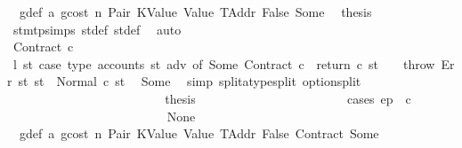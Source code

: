 \begin{isabellebody}
\ {}{\isacharparenleft}{\kern0pt}{}{\isacharparenright}{\kern0pt}\ g{\isacharunderscore}{\kern0pt}def\ a{}\ gcost\ n\ Pair\ KValue\ Value\ TAddr\ False\ Some\ \isamarkupfalse%
\ {\isacharquery}{\kern0pt}thesis\ \isamarkupfalse%
\ stmt{\isachardot}{\kern0pt}psimps{\isacharparenleft}{\kern0pt}{}{\isacharparenright}{\kern0pt}\ st{\isacharprime}{\kern0pt}{\isacharunderscore}{\kern0pt}def\ st{\isacharprime}{\kern0pt}{\isacharprime}{\kern0pt}{\isacharunderscore}{\kern0pt}def\ \isamarkupfalse%
\ auto\isanewline
\ \ \ \ \ \ \ \ \ \ \ \ \ \ \ \ \ \ \ \ \isamarkupfalse%
\isanewline
\ \ \ \ \ \ \ \ \ \ \ \ \ \ \ \ \ \ \ \ \ \ \isamarkupfalse%
\ {\isacharparenleft}{\kern0pt}Contract\ c{\isacharparenright}{\kern0pt}\isanewline
\ \ \ \ \ \ \ \ \ \ \ \ \ \ \ \ \ \ \ \ \ \ \isamarkupfalse%
\ \isamarkupfalse%
\ l{}{\isacharcolon}{\kern0pt}\ {\isachardoublequoteopen}{\isacharparenleft}{\kern0pt}{\isasymlambda}st{\isachardot}{\kern0pt}\ case\ type\ {\isacharparenleft}{\kern0pt}accounts\ st\ adv{\isacharparenright}{\kern0pt}\ of\ Some\ {\isacharparenleft}{\kern0pt}Contract\ c{\isacharparenright}{\kern0pt}\ {\isasymRightarrow}\ return\ c\ st\ {\isacharbar}{\kern0pt}\ {\isacharunderscore}{\kern0pt}\ {\isasymRightarrow}\ throw\ Err\ st{\isacharparenright}{\kern0pt}\ st{\isacharprime}{\kern0pt}{\isacharprime}{\kern0pt}\ {\isacharequal}{\kern0pt}\ Normal\ {\isacharparenleft}{\kern0pt}c{\isacharcomma}{\kern0pt}\ st{\isacharprime}{\kern0pt}{\isacharprime}{\kern0pt}{\isacharparenright}{\kern0pt}{\isachardoublequoteclose}\ \isamarkupfalse%
\ Some\ \isamarkupfalse%
\ {\isacharparenleft}{\kern0pt}simp\ split{\isacharcolon}{\kern0pt}atype{\isachardot}{\kern0pt}split\ option{\isachardot}{\kern0pt}split{\isacharparenright}{\kern0pt}\isanewline
\ \ \ \ \ \ \ \ \ \ \ \ \ \ \ \ \ \ \ \ \ \ \isamarkupfalse%
\ \isamarkupfalse%
\ {\isacharquery}{\kern0pt}thesis\isanewline
\ \ \ \ \ \ \ \ \ \ \ \ \ \ \ \ \ \ \ \ \ \ \isamarkupfalse%
\ {\isacharparenleft}{\kern0pt}cases\ {\isachardoublequoteopen}ep\ {\isachardollar}{\kern0pt}{\isachardollar}{\kern0pt}\ c{\isachardoublequoteclose}{\isacharparenright}{\kern0pt}\isanewline
\ \ \ \ \ \ \ \ \ \ \ \ \ \ \ \ \ \ \ \ \ \ \ \ \isamarkupfalse%
\ None\isanewline
\ \ \ \ \ \ \ \ \ \ \ \ \ \ \ \ \ \ \ \ \ \ \ \ \isamarkupfalse%
\ {}{\isacharparenleft}{\kern0pt}{}{\isacharparenright}{\kern0pt}\ g{\isacharunderscore}{\kern0pt}def\ a{}\ gcost\ n\ Pair\ KValue\ Value\ TAddr\ False\ Contract\ Some\ \isamarkupfalse%

\end{isabellebody}
